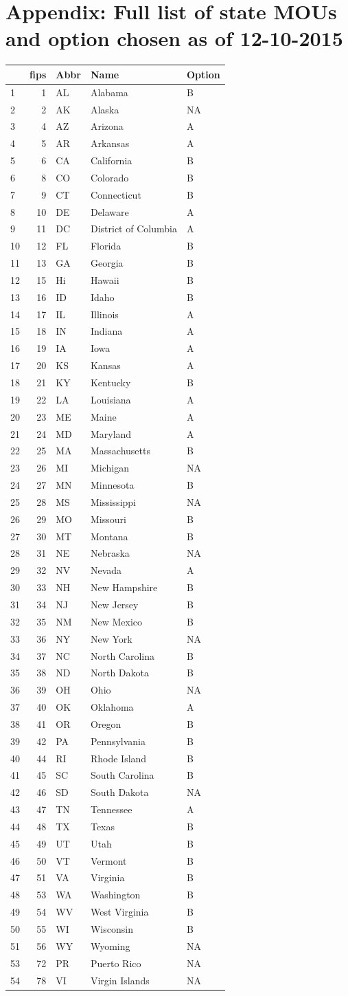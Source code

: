 \documentclass[]{article}
\begin{document}
\section{Appendix: Full list of state MOUs and option chosen as of
12-10-2015}\label{appendix-full-list-of-state-mous-and-option-chosen-as-of-12-10-2015}

\begin{longtable}[c]{@{}lrlll@{}}
\toprule
& fips & Abbr & Name & Option\tabularnewline
\midrule
\endhead
1 & 1 & AL & Alabama & B\tabularnewline
2 & 2 & AK & Alaska & NA\tabularnewline
3 & 4 & AZ & Arizona & A\tabularnewline
4 & 5 & AR & Arkansas & A\tabularnewline
5 & 6 & CA & California & B\tabularnewline
6 & 8 & CO & Colorado & B\tabularnewline
7 & 9 & CT & Connecticut & B\tabularnewline
8 & 10 & DE & Delaware & A\tabularnewline
9 & 11 & DC & District of Columbia & A\tabularnewline
10 & 12 & FL & Florida & B\tabularnewline
11 & 13 & GA & Georgia & B\tabularnewline
12 & 15 & Hi & Hawaii & B\tabularnewline
13 & 16 & ID & Idaho & B\tabularnewline
14 & 17 & IL & Illinois & A\tabularnewline
15 & 18 & IN & Indiana & A\tabularnewline
16 & 19 & IA & Iowa & A\tabularnewline
17 & 20 & KS & Kansas & A\tabularnewline
18 & 21 & KY & Kentucky & B\tabularnewline
19 & 22 & LA & Louisiana & A\tabularnewline
20 & 23 & ME & Maine & A\tabularnewline
21 & 24 & MD & Maryland & A\tabularnewline
22 & 25 & MA & Massachusetts & B\tabularnewline
23 & 26 & MI & Michigan & NA\tabularnewline
24 & 27 & MN & Minnesota & B\tabularnewline
25 & 28 & MS & Mississippi & NA\tabularnewline
26 & 29 & MO & Missouri & B\tabularnewline
27 & 30 & MT & Montana & B\tabularnewline
28 & 31 & NE & Nebraska & NA\tabularnewline
29 & 32 & NV & Nevada & A\tabularnewline
30 & 33 & NH & New Hampshire & B\tabularnewline
31 & 34 & NJ & New Jersey & B\tabularnewline
32 & 35 & NM & New Mexico & B\tabularnewline
33 & 36 & NY & New York & NA\tabularnewline
34 & 37 & NC & North Carolina & B\tabularnewline
35 & 38 & ND & North Dakota & B\tabularnewline
36 & 39 & OH & Ohio & NA\tabularnewline
37 & 40 & OK & Oklahoma & A\tabularnewline
38 & 41 & OR & Oregon & B\tabularnewline
39 & 42 & PA & Pennsylvania & B\tabularnewline
40 & 44 & RI & Rhode Island & B\tabularnewline
41 & 45 & SC & South Carolina & B\tabularnewline
42 & 46 & SD & South Dakota & NA\tabularnewline
43 & 47 & TN & Tennessee & A\tabularnewline
44 & 48 & TX & Texas & B\tabularnewline
45 & 49 & UT & Utah & B\tabularnewline
46 & 50 & VT & Vermont & B\tabularnewline
47 & 51 & VA & Virginia & B\tabularnewline
48 & 53 & WA & Washington & B\tabularnewline
49 & 54 & WV & West Virginia & B\tabularnewline
50 & 55 & WI & Wisconsin & B\tabularnewline
51 & 56 & WY & Wyoming & NA\tabularnewline
53 & 72 & PR & Puerto Rico & NA\tabularnewline
54 & 78 & VI & Virgin Islands & NA\tabularnewline
\bottomrule
\end{longtable}
\end{document}
